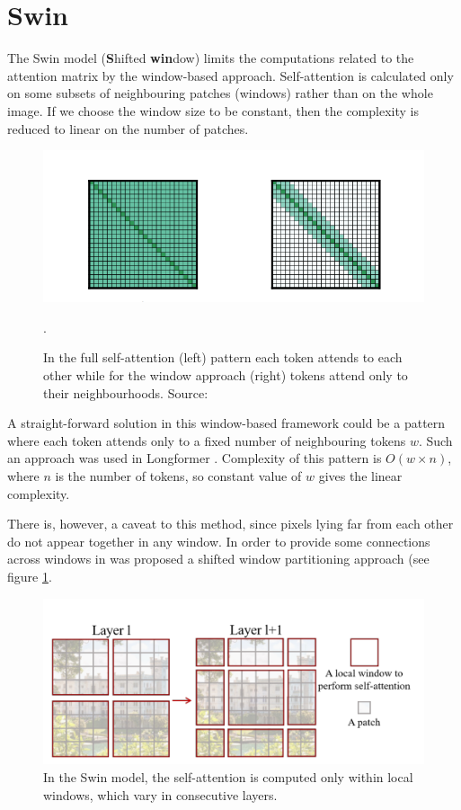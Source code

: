 \documentclass[magisterska,en]{pracamgr}
\begin{document}
\section{Swin}\label{r:swin}
The Swin model (\textbf{S}hifted \textbf{win}dow) \cite{DBLP:conf/iccv/LiuL00W0LG21} limits the computations related to the attention matrix by the window-based approach. Self-attention is calculated only on some subsets of neighbouring patches (windows) rather than on the whole image. If we choose the window size to be constant, then the complexity is reduced to linear on the number of patches.
\begin{figure}[H]
\centering
\includegraphics[scale=0.4]{./images/sliding_window.png}
\caption{In the full self-attention (left) pattern each token attends to each other while for the window approach (right) tokens attend only to their neighbourhoods. Source: \cite{DBLP:journals/corr/abs-2004-05150}}.
\end{figure}


A straight-forward solution in this window-based framework could be a pattern where each token attends only to a fixed number of neighbouring tokens $w$. Such an approach was used in Longformer \cite{DBLP:journals/corr/abs-2004-05150}. Complexity of this pattern is $O(w \times n)$, where $n$ is the number of tokens, so constant
value of $w$ gives the linear complexity.

There is, however, a caveat to this method, since pixels lying far from each other do not appear together in any window. In order to provide some connections across windows in \cite{DBLP:conf/iccv/LiuL00W0LG21} was proposed a shifted window partitioning approach (see figure \ref{changing_windows}.


\begin{figure}[H]
\centering
\includegraphics[scale=0.6]{./images/changing_windows.png}
\caption{In the Swin model, the self-attention is computed only within local windows, which vary in consecutive layers.}
\label{changing_windows}
\end{figure}
\end{document}
